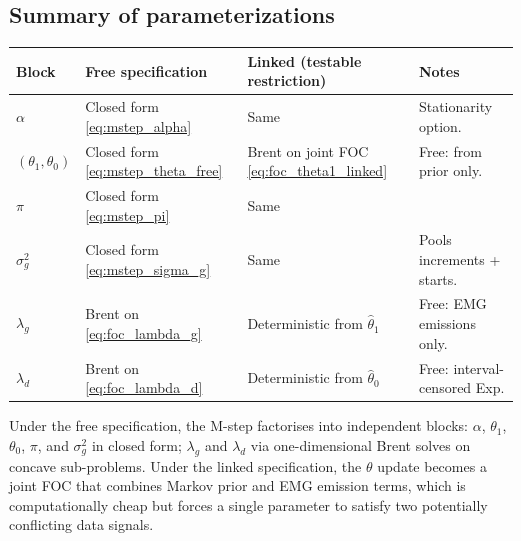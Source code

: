 \documentclass[12pt]{article}
\begin{document}
\subsection{Summary of parameterizations}
\begin{center}
\begin{tabular}{llll}
\toprule
Block & Free specification & Linked (testable restriction) & Notes \\
\midrule
\(\alpha\) & Closed form \eqref{eq:mstep_alpha} & Same & Stationarity option.\\
\((\theta_1,\theta_0)\) & Closed form \eqref{eq:mstep_theta_free} & Brent on joint FOC \eqref{eq:foc_theta1_linked} & Free: from prior only.\\
\(\pi\) & Closed form \eqref{eq:mstep_pi} & Same & \\
\(\sigma_g^2\) & Closed form \eqref{eq:mstep_sigma_g} & Same & Pools increments + starts.\\
\(\lambda_g\) & Brent on \eqref{eq:foc_lambda_g} & Deterministic from \(\hat\theta_1\) & Free: EMG emissions only.\\
\(\lambda_d\) & Brent on \eqref{eq:foc_lambda_d} & Deterministic from \(\hat\theta_0\) & Free: interval-censored Exp.\\
\bottomrule
\end{tabular}
\end{center}
Under the free specification, the M-step factorises into independent blocks: \(\alpha\), \(\theta_1\), \(\theta_0\), \(\pi\), and \(\sigma_g^2\) in closed form; \(\lambda_g\) and \(\lambda_d\) via one-dimensional Brent solves on concave sub-problems. Under the linked specification, the \(\theta\) update becomes a joint FOC that combines Markov prior and EMG emission terms, which is computationally cheap but forces a single parameter to satisfy two potentially conflicting data signals.

\newpage
\end{document}
